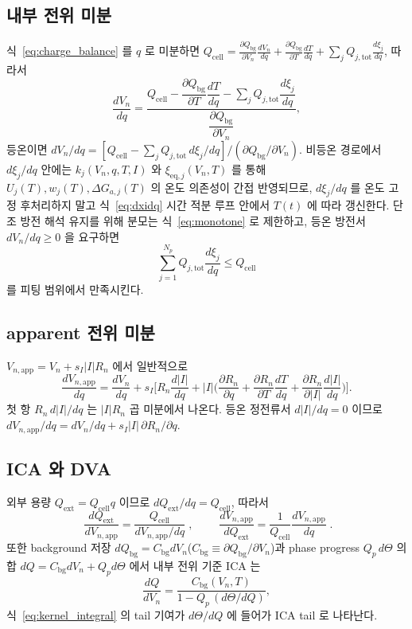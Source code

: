 \documentclass[11pt,a4paper]{article}
\newcommand{\eq}{\mathrm{eq}}
\newcommand{\app}{\mathrm{app}}
\newcommand{\tot}{\mathrm{tot}}
\newcommand{\bg}{\mathrm{bg}}
\newcommand{\cell}{\mathrm{cell}}
\newcommand{\ext}{\mathrm{ext}}
\begin{document}
\subsection{내부 전위 미분}
식~\eqref{eq:charge_balance} 를 $q$ 로 미분하면
$Q_\cell=\frac{\partial Q_\bg}{\partial V_n}\frac{dV_n}{dq}+\frac{\partial Q_\bg}{\partial T}\frac{dT}{dq}
+\sum_j Q_{j,\tot}\frac{d\xi_j}{dq}$, 따라서
\begin{equation}
\frac{dV_n}{dq}=\frac{Q_\cell-\dfrac{\partial Q_\bg}{\partial T}\dfrac{dT}{dq}-\sum_j Q_{j,\tot}\dfrac{d\xi_j}{dq}}
{\dfrac{\partial Q_\bg}{\partial V_n}},
\label{eq:dVdq_gen}
\end{equation}
등온이면 $dV_n/dq=[Q_\cell-\sum_j Q_{j,\tot}\,d\xi_j/dq]/(\partial Q_\bg/\partial V_n)$. 비등온 경로에서
$d\xi_j/dq$ 안에는 $k_j(V_n,q,T,I)$ 와 $\xi_{\eq,j}(V_n,T)$ 를 통해 $U_j(T),w_j(T),\Delta G_{a,j}(T)$ 의
온도 의존성이 간접 반영되므로, $d\xi_j/dq$ 를 온도 고정 후처리하지 말고 식~\eqref{eq:dxidq} 시간 적분
루프 안에서 $T(t)$ 에 따라 갱신한다. 단조 방전 해석 유지를 위해 분모는 식~\eqref{eq:monotone} 로
제한하고, 등온 방전서 $dV_n/dq\ge0$ 을 요구하면
\begin{equation}
\boxed{\;\sum_{j=1}^{N_p}Q_{j,\tot}\frac{d\xi_j}{dq}\le Q_\cell\;}
\label{eq:monoconstraint}
\end{equation}
를 피팅 범위에서 만족시킨다.

\subsection{apparent 전위 미분}
$V_{n,\app}=V_n+s_I|I|R_n$ 에서 일반적으로
\begin{equation}
\frac{dV_{n,\app}}{dq}=\frac{dV_n}{dq}+s_I\Big[R_n\frac{d|I|}{dq}
+|I|\Big(\frac{\partial R_n}{\partial q}+\frac{\partial R_n}{\partial T}\frac{dT}{dq}+\frac{\partial R_n}{\partial|I|}\frac{d|I|}{dq}\Big)\Big].
\label{eq:dVappdq_gen}
\end{equation}
첫 항 $R_n\,d|I|/dq$ 는 $|I|R_n$ 곱 미분에서 나온다. 등온 정전류서 $d|I|/dq=0$ 이므로
$dV_{n,\app}/dq=dV_n/dq+s_I|I|\,\partial R_n/\partial q$.

\subsection{ICA 와 DVA}
외부 용량 $Q_\ext=Q_\cell q$ 이므로 $dQ_\ext/dq=Q_\cell$, 따라서
\begin{equation}
\boxed{\;\frac{dQ_\ext}{dV_{n,\app}}=\frac{Q_\cell}{dV_{n,\app}/dq}\;},\qquad
\boxed{\;\frac{dV_{n,\app}}{dQ_\ext}=\frac{1}{Q_\cell}\frac{dV_{n,\app}}{dq}\;}.
\label{eq:icadva}
\end{equation}
또한 background 저장 $dQ_\bg=C_\bg dV_n$($C_\bg\equiv\partial Q_\bg/\partial V_n$)과 phase progress
$Q_p\,d\Theta$ 의 합 $dQ=C_\bg dV_n+Q_p d\Theta$ 에서 내부 전위 기준 ICA 는
\begin{equation}
\frac{dQ}{dV_n}=\frac{C_\bg(V_n,T)}{1-Q_p\,(d\Theta/dQ)},
\label{eq:ica_internal}
\end{equation}
식~\eqref{eq:kernel_integral} 의 tail 기여가 $d\Theta/dQ$ 에 들어가 ICA tail 로 나타난다.
\end{document}
